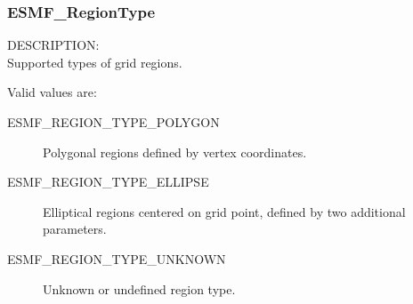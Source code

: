 % 
% 


\subsubsection{ESMF\_RegionType}

{\sf DESCRIPTION:\\}
Supported types of grid regions.

Valid values are:
\begin{description}
   \item [ESMF\_REGION\_TYPE\_POLYGON]
         Polygonal regions defined by vertex coordinates.
   \item [ESMF\_REGION\_TYPE\_ELLIPSE]
         Elliptical regions centered on grid point, defined by two 
         additional parameters.
   \item [ESMF\_REGION\_TYPE\_UNKNOWN]
         Unknown or undefined region type.
\end{description}
